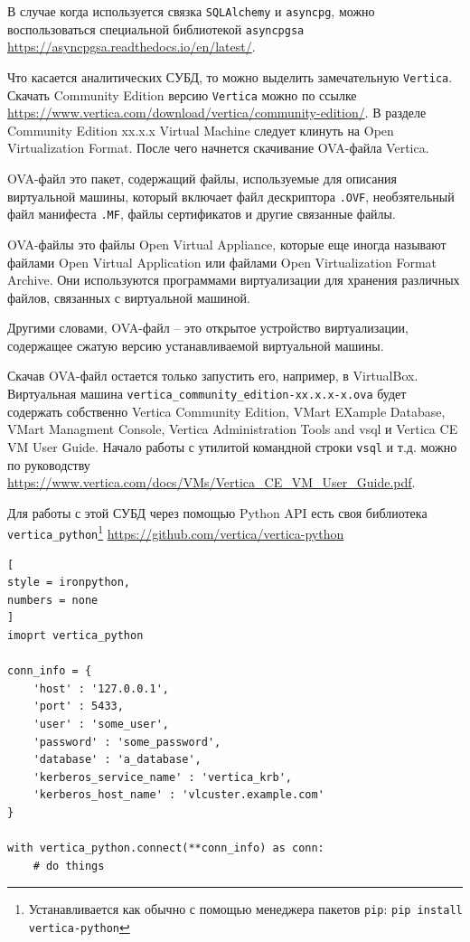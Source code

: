 \documentclass[%
	11pt,
	a4paper,
	utf8,
		]{article}
\begin{document}
В случае когда используется связка \texttt{SQLAlchemy} и \texttt{asyncpg}, можно воспользоваться специальной библиотекой \texttt{asyncpgsa} \url{https://asyncpgsa.readthedocs.io/en/latest/}.

Что касается аналитических СУБД, то можно выделить замечательную \texttt{Vertica}. Скачать Community Edition версию \texttt{Vertica} можно по ссылке \url{https://www.vertica.com/download/vertica/community-edition/}. В разделе Community Edition xx.x.x Virtual Machine следует клинуть на Open Virtualization Format. После чего начнется скачивание OVA-файла Vertica.

OVA-файл это пакет, содержащий файлы, используемые для описания виртуальной машины, который включает файл дескриптора \texttt{.OVF}, необзятельный файл манифеста \texttt{.MF}, файлы сертификатов и другие связанные файлы.

OVA-файлы это файлы Open Virtual Appliance, которые еще иногда называют файлами Open Virtual Application или файлами Open Virtualization Format Archive. Они используются программами виртуализации для хранения различных файлов, связанных с виртуальной машиной.

Другими словами, OVA-файл -- это открытое устройство виртуализации, содержащее сжатую версию устанавливаемой виртуальной машины.

Скачав OVA-файл остается только запустить его, например, в VirtualBox. Виртуальная машина \texttt{vertica\_community\_edition-xx.x.x-x.ova} будет содержать собственно Vertica Community Edition, VMart EXample Database, VMart Managment Console, Vertica Administration Tools and vsql и Vertica CE VM User Guide. Начало работы с утилитой командной строки \texttt{vsql} и т.д. можно по руководству \url{https://www.vertica.com/docs/VMs/Vertica_CE_VM_User_Guide.pdf}.

Для работы с этой СУБД через помощью Python API есть своя библиотека \texttt{vertica\_python}\footnote{Устанавливается как обычно с помощью менеджера пакетов \texttt{pip}: \texttt{pip install vertica-python}} \url{https://github.com/vertica/vertica-python}

\begin{lstlisting}[
style = ironpython,
numbers = none
]
imoprt vertica_python

conn_info = {
    'host' : '127.0.0.1',
    'port' : 5433,
    'user' : 'some_user',
    'password' : 'some_password',
    'database' : 'a_database',
    'kerberos_service_name' : 'vertica_krb',
    'kerberos_host_name' : 'vlcuster.example.com'
}

with vertica_python.connect(**conn_info) as conn:
    # do things
\end{lstlisting}
\end{document}
